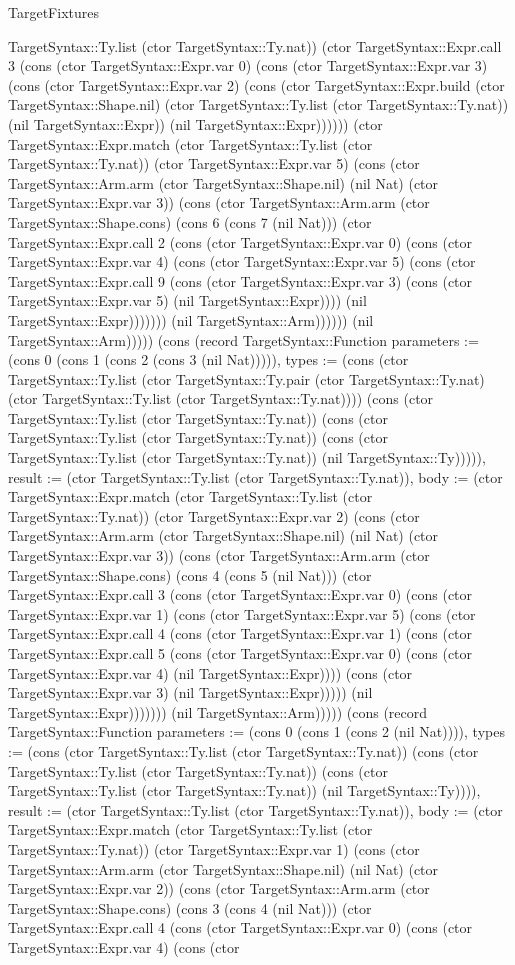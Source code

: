 \begin{lexlean}{TargetFixtures}
\begin{semanticmodule}
{TargetSyntax::Ty.list (ctor TargetSyntax::Ty.nat)) (ctor TargetSyntax::Expr.call 3 (cons (ctor TargetSyntax::Expr.var 0) (cons (ctor TargetSyntax::Expr.var 3) (cons (ctor TargetSyntax::Expr.var 2) (cons (ctor TargetSyntax::Expr.build (ctor TargetSyntax::Shape.nil) (ctor TargetSyntax::Ty.list (ctor TargetSyntax::Ty.nat)) (nil TargetSyntax::Expr)) (nil TargetSyntax::Expr)))))) (ctor TargetSyntax::Expr.match (ctor TargetSyntax::Ty.list (ctor TargetSyntax::Ty.nat)) (ctor TargetSyntax::Expr.var 5) (cons (ctor TargetSyntax::Arm.arm (ctor TargetSyntax::Shape.nil) (nil Nat) (ctor TargetSyntax::Expr.var 3)) (cons (ctor TargetSyntax::Arm.arm (ctor TargetSyntax::Shape.cons) (cons 6 (cons 7 (nil Nat))) (ctor TargetSyntax::Expr.call 2 (cons (ctor TargetSyntax::Expr.var 0) (cons (ctor TargetSyntax::Expr.var 4) (cons (ctor TargetSyntax::Expr.var 5) (cons (ctor TargetSyntax::Expr.call 9 (cons (ctor TargetSyntax::Expr.var 3) (cons (ctor TargetSyntax::Expr.var 5) (nil TargetSyntax::Expr)))) (nil TargetSyntax::Expr))))))) (nil TargetSyntax::Arm)))))) (nil TargetSyntax::Arm))))}) (cons (record TargetSyntax::Function {parameters := (cons 0 (cons 1 (cons 2 (cons 3 (nil Nat))))), types := (cons (ctor TargetSyntax::Ty.list (ctor TargetSyntax::Ty.pair (ctor TargetSyntax::Ty.nat) (ctor TargetSyntax::Ty.list (ctor TargetSyntax::Ty.nat)))) (cons (ctor TargetSyntax::Ty.list (ctor TargetSyntax::Ty.nat)) (cons (ctor TargetSyntax::Ty.list (ctor TargetSyntax::Ty.nat)) (cons (ctor TargetSyntax::Ty.list (ctor TargetSyntax::Ty.nat)) (nil TargetSyntax::Ty))))), result := (ctor TargetSyntax::Ty.list (ctor TargetSyntax::Ty.nat)), body := (ctor TargetSyntax::Expr.match (ctor TargetSyntax::Ty.list (ctor TargetSyntax::Ty.nat)) (ctor TargetSyntax::Expr.var 2) (cons (ctor TargetSyntax::Arm.arm (ctor TargetSyntax::Shape.nil) (nil Nat) (ctor TargetSyntax::Expr.var 3)) (cons (ctor TargetSyntax::Arm.arm (ctor TargetSyntax::Shape.cons) (cons 4 (cons 5 (nil Nat))) (ctor TargetSyntax::Expr.call 3 (cons (ctor TargetSyntax::Expr.var 0) (cons (ctor TargetSyntax::Expr.var 1) (cons (ctor TargetSyntax::Expr.var 5) (cons (ctor TargetSyntax::Expr.call 4 (cons (ctor TargetSyntax::Expr.var 1) (cons (ctor TargetSyntax::Expr.call 5 (cons (ctor TargetSyntax::Expr.var 0) (cons (ctor TargetSyntax::Expr.var 4) (nil TargetSyntax::Expr)))) (cons (ctor TargetSyntax::Expr.var 3) (nil TargetSyntax::Expr))))) (nil TargetSyntax::Expr))))))) (nil TargetSyntax::Arm))))}) (cons (record TargetSyntax::Function {parameters := (cons 0 (cons 1 (cons 2 (nil Nat)))), types := (cons (ctor TargetSyntax::Ty.list (ctor TargetSyntax::Ty.nat)) (cons (ctor TargetSyntax::Ty.list (ctor TargetSyntax::Ty.nat)) (cons (ctor TargetSyntax::Ty.list (ctor TargetSyntax::Ty.nat)) (nil TargetSyntax::Ty)))), result := (ctor TargetSyntax::Ty.list (ctor TargetSyntax::Ty.nat)), body := (ctor TargetSyntax::Expr.match (ctor TargetSyntax::Ty.list (ctor TargetSyntax::Ty.nat)) (ctor TargetSyntax::Expr.var 1) (cons (ctor TargetSyntax::Arm.arm (ctor TargetSyntax::Shape.nil) (nil Nat) (ctor TargetSyntax::Expr.var 2)) (cons (ctor TargetSyntax::Arm.arm (ctor TargetSyntax::Shape.cons) (cons 3 (cons 4 (nil Nat))) (ctor TargetSyntax::Expr.call 4 (cons (ctor TargetSyntax::Expr.var 0) (cons (ctor TargetSyntax::Expr.var 4) (cons (ctor }
\end{semanticmodule}
\end{lexlean}
